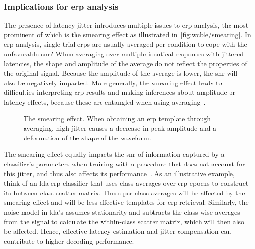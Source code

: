 \subsubsection{Implications for \ac{erp} analysis}

The presence of latency jitter introduces multiple issues to \ac{erp} analysis, the
most prominent of which is the smearing effect as illustrated
in~\autoref{fig:wcble/smearing}. In \ac{erp} analysis, single-trial \acp{erp} are usually
averaged per condition to cope with the unfavorable \ac{snr}?
When averaging over multiple identical responses with jittered latencies, the shape
and amplitude of the average do not reflect the properties
of the original signal.
Because the amplitude of the average is lower, the \ac{snr} will also be negatively impacted.
More generally, the smearing effect leads to difficulties interpreting \ac{erp}
results and making inferences about amplitude or latency effects, because these
are entangled when using averaging~\cite{Woody1967, Pfefferbaum1980, McDowell2003, Verleger2005,
	Roth2007, Walhovd2008, Poli2010, Luck2014}.

\begin{figure}[t]
  \centering
  
  \caption[The smearing effect.]{The smearing effect. When obtaining an \ac{erp} template through
  averaging, high jitter causes a decrease in peak amplitude and a deformation
  of the shape of the waveform.}
  \label{fig:wcble/smearing}
\end{figure}


The smearing effect equally impacts the \ac{snr} of information captured by a
classifier's parameters when training with a procedure that does not account for
this jitter, and thus also affects its performance~\cite{Thompson2012}.
As an illustrative example, think of an \ac{lda} \ac{erp} classifier that uses
class averages over \ac{erp} epochs to construct its between-class scatter
matrix.
These per-class averages will be affected by the smearing effect and will be
less effective templates for \ac{erp} retrieval.
Similarly, the noise model in \ac{lda}'s  assumes stationarity and subtracts
the class-wise averages from the signal to calculate
the within-class scatter matrix, which will then also be affected.
Hence, effective latency estimation and jitter compensation can contribute to higher
decoding performance.

